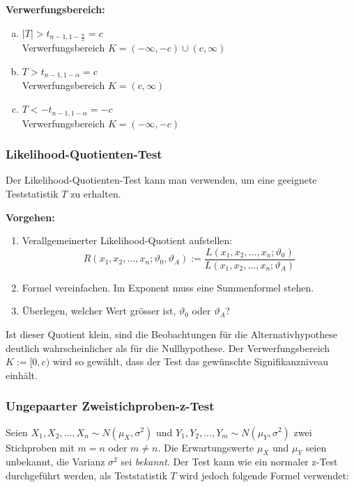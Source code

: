 \vspace{10pt}

\textbf{Verwerfungsbereich:}
\begin{enumerate}[a)]
	\item $|T|>t_{n-1,1-\frac{\alpha}{2}}=c$ \\
	Verwerfungsbereich $K=(-\infty,-c) \cup (c,\infty)$
	\item $T>t_{n-1,1-\alpha}=c$ \\
	Verwerfungsbereich $K=(c,\infty)$
	\item $T<-t_{n-1,1-\alpha}=-c$ \\
	Verwerfungsbereich $K=(-\infty,-c)$
\end{enumerate}





\subsubsection{Likelihood-Quotienten-Test}
Der Likelihood-Quotienten-Test kann man verwenden, um eine geeignete Teststatistik $T$ zu erhalten. 

\vspace{10pt}

\textbf{Vorgehen:}
\begin{enumerate}
	\item Verallgemeinerter Likelihood-Quotient aufstellen:
	\[
	R(x_1,x_2,...,x_n;\vartheta_0,\vartheta_A):=\frac{L(x_1,x_2,...,x_n;\vartheta_0)}{L(x_1,x_2,...,x_n;\vartheta_A)}
	\]
	\item Formel vereinfachen. Im Exponent muss eine Summenformel stehen.
	\item Überlegen, welcher Wert grösser ist, $\vartheta_0$ oder $\vartheta_A$?                  
\end{enumerate}

Ist dieser Quotient klein, sind die Beobachtungen für die Alternativhypothese deutlich wahrscheinlicher als für die Nullhypothese. Der Verwerfungsbereich $K:=[0,c)$ wird so gewählt, dass der Test das gewünschte Signifikanzniveau einhält.

\subsubsection{Ungepaarter Zweistichproben-z-Test}
Seien $X_1,X_2,...,X_n \sim N(\mu_X,\sigma^2)$ und $Y_1,Y_2,...,Y_m \sim N(\mu_Y,\sigma^2)$ zwei Stichproben mit $m = n$ oder $m \neq n$. Die Erwartungswerte $\mu_X$ und $\mu_Y$ seien unbekannt, die Varianz $\sigma^2$ sei \emph{bekannt}. Der Test kann wie ein normaler z-Test durchgeführt werden, als Teststatistik $T$ wird jedoch folgende Formel verwendet:

